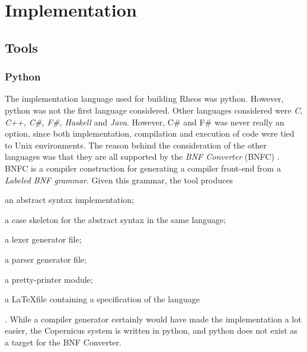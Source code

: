 \chapter{Implementation}\label{chap:implementation}


%
%
%

\section{Tools}

\subsection{Python}
The implementation language used for building Rheos was
python. However, python was not the first language considered. Other
languages considered were \emph{C, C++, C\#, F\#, Haskell} and
\emph{Java}. However, C\# and F\# was never really an option, since
both implementation, compilation and execution of code were tied to
Unix environments. The reason behind the consideration of the other
languages was that they are all supported by the \emph{BNF Converter}
(BNFC) \citep{bnfc:online}. BNFC is a compiler construction for
generating a compiler front-end from a \emph{Labeled BNF
  grammar}. Given this grammar, the tool produces
\begin{inparaenum}[(1)]
\item an abstract syntax implementation;
\item a case skeleton for the abstract syntax in the same language;
\item a lexer generator file;
\item a parser generator file;
\item a pretty-printer module;
\item a \LaTeX file containing a specification of the language
\end{inparaenum} \citep{bnfc:online}.
While a compiler generator certainly would have made the
implementation a lot easier, the Copernicus system is written in
python, and python does not exist as a target for the BNF Converter.

